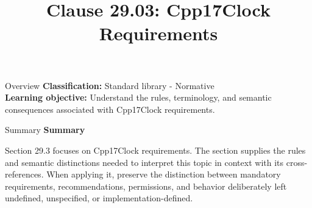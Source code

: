 \documentclass[10pt,letterpaper]{article}
\title{Clause 29.03: Cpp17Clock Requirements}
\author{}
\date{}
\begin{document}
\maketitle
\begin{CornellOverviewBox}{Overview}
\textbf{Classification:} Standard library - Normative\\[2pt]
\textbf{Learning objective:} Understand the rules, terminology, and semantic consequences associated with Cpp17Clock requirements.
\end{CornellOverviewBox}\begin{CornellSummaryBox}{Summary}
{\sffamily\bfseries\color{Accent} Summary}\par\vspace{3pt}Section 29.3 focuses on Cpp17Clock requirements. The section supplies the rules and semantic distinctions needed to interpret this topic in context with its cross-references. When applying it, preserve the distinction between mandatory requirements, recommendations, permissions, and behavior deliberately left undefined, unspecified, or implementation-defined.
\end{CornellSummaryBox}
\end{document}
